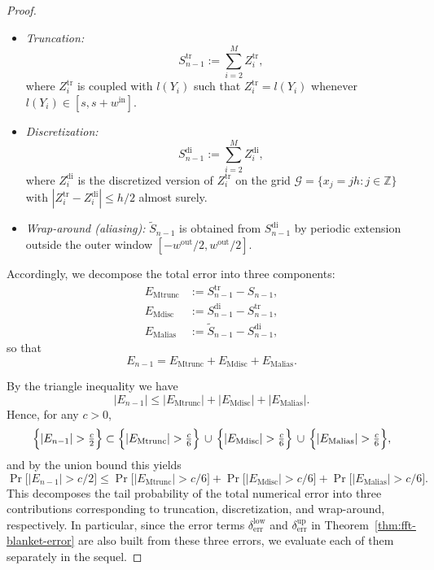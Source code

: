 \documentclass{article}
\theoremstyle{plain}
\theoremstyle{definition}
\begin{document}
\begin{proof}
\begin{itemize}
  \item \emph{Truncation:}
  \[
    S_{n-1}^{\mathrm{tr}}
    :=
    \sum_{i=2}^M Z_i^{\mathrm{tr}},
  \]
  where $Z_i^{\mathrm{tr}}$ is coupled with $l(Y_i)$ such that $Z_i^{\mathrm{tr}} = l(Y_i)$ whenever $l(Y_i) \in [s, s+w^{\mathrm{in}}]$.

  \item \emph{Discretization:}
  \[
    S_{n-1}^{\mathrm{di}}
    :=
    \sum_{i=2}^M Z_i^{\mathrm{di}},
  \]
  where \(Z_i^{\mathrm{di}}\) is the discretized version of
  \(Z_i^{\mathrm{tr}}\) on the grid \(\mathcal G = \{x_j=jh:j\in\mathbb Z\}\)
  with \(|Z_i^{\mathrm{tr}}-Z_i^{\mathrm{di}}|\le h/2\) almost surely.

  \item \emph{Wrap-around (aliasing):}
  \(\widetilde S_{n-1}\) is obtained from \(S_{n-1}^{\mathrm{di}}\) by
  periodic extension outside the outer window
  \([-w^{\mathrm{out}}/2,w^{\mathrm{out}}/2]\).
\end{itemize}

Accordingly, we decompose the total error into three components:
\begin{align*}
  E_{\mathrm{Mtrunc}}
  &:= S_{n-1}^{\mathrm{tr}} - S_{n-1},
  \\
  E_{\mathrm{Mdisc}}
  &:= S_{n-1}^{\mathrm{di}} - S_{n-1}^{\mathrm{tr}},
  \\
  E_{\mathrm{Malias}}
  &:= \widetilde S_{n-1} - S_{n-1}^{\mathrm{di}},
\end{align*}
so that
\[
  E_{n-1}
  = E_{\mathrm{Mtrunc}}
    + E_{\mathrm{Mdisc}}
    + E_{\mathrm{Malias}}.
\]

By the triangle inequality we have
\[
  |E_{n-1}|
  \le
  |E_{\mathrm{Mtrunc}}|
  + |E_{\mathrm{Mdisc}}|
  + |E_{\mathrm{Malias}}|.
\]
Hence, for any \(c>0\),
\[
  \Bigl\{|E_{n-1}|>\tfrac{c}{2}\Bigr\}
  \subset
  \Bigl\{|E_{\mathrm{Mtrunc}}|>\tfrac{c}{6}\Bigr\}
  \,\cup\,
  \Bigl\{|E_{\mathrm{Mdisc}}|>\tfrac{c}{6}\Bigr\}
  \,\cup\,
  \Bigl\{|E_{\mathrm{Malias}}|>\tfrac{c}{6}\Bigr\},
\]
and by the union bound this yields
\begin{equation}
  \label{eq:E-decomposition}
  \Pr\bigl[|E_{n-1}|>c/2\bigr]
  \le
  \Pr\bigl[|E_{\mathrm{Mtrunc}}|>c/6\bigr]
  +
  \Pr\bigl[|E_{\mathrm{Mdisc}}|>c/6\bigr]
  +
  \Pr\bigl[|E_{\mathrm{Malias}}|>c/6\bigr].
\end{equation}
This decomposes the tail probability of the total numerical error into
three contributions corresponding to truncation, discretization, and
wrap-around, respectively.
In particular, since the error terms
\(\delta_{\mathrm{err}}^{\mathrm{low}}\) and
\(\delta_{\mathrm{err}}^{\mathrm{up}}\) in
Theorem~\ref{thm:fft-blanket-error} are also built from these three errors, we evaluate each of them separately in the sequel.



\end{proof}
\end{document}

